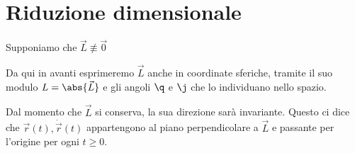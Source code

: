 \section{Riduzione dimensionale}

Supponiamo che \(\vec{L} \not\equiv \vec{0}\)

\begin{notz}
	Da qui in avanti esprimeremo \(\vec{L}\) anche in coordinate sferiche, tramite il suo modulo \(L=\abs{\vec{L}}\) e gli angoli \(\q\) e \(\j\) che lo individuano nello spazio.
\end{notz}
\noindent
Dal momento che \(\vec{L}\) si conserva, la sua direzione sarà invariante.
Questo ci dice che \(\vec{r}(t),\dot{\vec{r}}(t)\) appartengono al piano perpendicolare a \(\vec{L}\) e passante per l'origine per ogni \(t\ge 0\).

